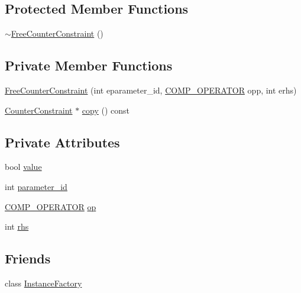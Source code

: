 \subsection*{Protected Member Functions}
\begin{DoxyCompactItemize}
\item 
\mbox{\hyperlink{classgraphsat_1_1_free_counter_constraint_aa7d6233a26506144c01f0f70051c7742}{$\sim$\+Free\+Counter\+Constraint}} ()
\end{DoxyCompactItemize}
\subsection*{Private Member Functions}
\begin{DoxyCompactItemize}
\item 
\mbox{\hyperlink{classgraphsat_1_1_free_counter_constraint_a91b765518351c549e3683ca7b6d65a81}{Free\+Counter\+Constraint}} (int eparameter\+\_\+id, \mbox{\hyperlink{namespacegraphsat_acfb5939f9bdafbd9aea0d084b9a56f69}{C\+O\+M\+P\+\_\+\+O\+P\+E\+R\+A\+T\+OR}} opp, int erhs)
\item 
\mbox{\hyperlink{classgraphsat_1_1_counter_constraint}{Counter\+Constraint}} $\ast$ \mbox{\hyperlink{classgraphsat_1_1_free_counter_constraint_ac47312ffc877f233912491bf380769a9}{copy}} () const
\end{DoxyCompactItemize}
\subsection*{Private Attributes}
\begin{DoxyCompactItemize}
\item 
bool \mbox{\hyperlink{classgraphsat_1_1_free_counter_constraint_a3c357f4c9f5b8c8b962ab76034d8c0c6}{value}}
\item 
int \mbox{\hyperlink{classgraphsat_1_1_free_counter_constraint_a178d82aba3134f3b64a048afff61ebc0}{parameter\+\_\+id}}
\item 
\mbox{\hyperlink{namespacegraphsat_acfb5939f9bdafbd9aea0d084b9a56f69}{C\+O\+M\+P\+\_\+\+O\+P\+E\+R\+A\+T\+OR}} \mbox{\hyperlink{classgraphsat_1_1_free_counter_constraint_a64a6e7d3ff85acea5a0a98719a6bf196}{op}}
\item 
int \mbox{\hyperlink{classgraphsat_1_1_free_counter_constraint_a3b7d8ae7e3eb0c9a1318fed5cf88af55}{rhs}}
\end{DoxyCompactItemize}
\subsection*{Friends}
\begin{DoxyCompactItemize}
\item 
class \mbox{\hyperlink{classgraphsat_1_1_free_counter_constraint_ad4b3c25c041701ae56dc1e78df779d2f}{Instance\+Factory}}
\end{DoxyCompactItemize}


